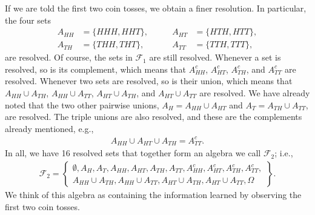 \documentclass[\topdir/lecture\_notes.tex]{subfiles}
\begin{document}
\begin{optional}
\begin{example}
If we are told the first two coin tosses, we obtain a finer resolution. In particular, the four sets
\begin{equation*}
\begin{split}
A_{H H}&=\{H H H, H H T\}, \\
A_{T H}&=\{T H H, T H T\},
\end{split}
\quad \quad
\begin{split}
A_{H T}&=\{H T H, H T T\},  \\
A_{T T}&=\{T T H, T T T\},
\end{split}
\end{equation*}
are resolved. Of course, the sets in \(\mathcal{F}_{1}\) are still resolved. Whenever a set is resolved, so is its complement, which means that \(A_{H H}^{c}\), \(A_{H T}^{c}\), \( A_{T H}^{c}\), and \(A_{T T}^{c}\) are resolved. Whenever two sets are resolved, so is their union, which means that \(A_{H H} \cup A_{T H}\), \( A_{H H} \cup A_{T T}\), \( A_{H T} \cup A_{T H}\), and \(A_{H T} \cup A_{T T}\) are resolved. We have already noted that the two other pairwise unions, \(A_{H}=A_{H H} \cup A_{H T}\) and \(A_{T}=A_{T H} \cup A_{T T}\), are resolved. The triple unions are also resolved, and these are the complements already mentioned, e.g.,
\begin{align*}
A_{H H} \cup A_{H T} \cup A_{T H}=A_{T T}^{c}.
\end{align*}
In all, we have 16 resolved sets that together form an algebra we call \(\mathcal{F}_{2}\); i.e.,
\begin{align*}
\mathcal{F}_{2}=\left\{\begin{array}{l}
\emptyset, A_{H}, A_{T}, A_{H H}, A_{H T}, A_{T H}, A_{T T}, A_{H H}^{c}, A_{H T}^{c}, A_{T H}^{c}, A_{T T}^{c},  \tag{2.1.3}\\
A_{H H} \cup A_{T H}, A_{H H} \cup A_{T T}, A_{H T} \cup A_{T H}, A_{H T} \cup A_{T T}, \Omega
\end{array}\right\} .
\end{align*}
We think of this algebra as containing the information learned by observing the first two coin tosses.


\end{example}
\end{optional}
\end{document}
